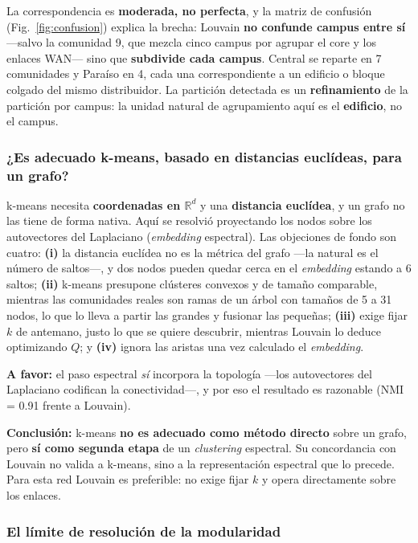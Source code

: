 \documentclass[11pt, a4paper]{article}
\begin{document}
La correspondencia es \textbf{moderada, no perfecta}, y la matriz de
confusión (Fig.~\ref{fig:confusion}) explica la brecha: Louvain \textbf{no
confunde campus entre sí} —salvo la comunidad 9, que mezcla cinco campus
por agrupar el core y los enlaces WAN— sino que \textbf{subdivide cada
campus}. Central se reparte en 7 comunidades y Paraíso en 4, cada una
correspondiente a un edificio o bloque colgado del mismo distribuidor. La
partición detectada es un \textbf{refinamiento} de la partición por campus:
la unidad natural de agrupamiento aquí es el \textbf{edificio}, no el
campus.

\subsubsection*{¿Es adecuado k-means, basado en distancias euclídeas, para un grafo?}

k-means necesita \textbf{coordenadas en $\mathbb{R}^d$} y una
\textbf{distancia euclídea}, y un grafo no las tiene de forma nativa. Aquí
se resolvió proyectando los nodos sobre los autovectores del Laplaciano
(\textit{embedding} espectral). Las objeciones de fondo son cuatro:
\textbf{(i)} la distancia euclídea no es la métrica del grafo —la natural
es el número de saltos—, y dos nodos pueden quedar cerca en el
\textit{embedding} estando a 6 saltos; \textbf{(ii)} k-means presupone
clústeres convexos y de tamaño comparable, mientras las comunidades reales
son ramas de un árbol con tamaños de 5 a 31 nodos, lo que lo lleva a partir
las grandes y fusionar las pequeñas; \textbf{(iii)} exige fijar $k$ de
antemano, justo lo que se quiere descubrir, mientras Louvain lo deduce
optimizando $Q$; y \textbf{(iv)} ignora las aristas una vez calculado el
\textit{embedding}.

\textbf{A favor:} el paso espectral \textit{sí} incorpora la topología —los
autovectores del Laplaciano codifican la conectividad—, y por eso el
resultado es razonable (NMI = 0.91 frente a Louvain).

\textbf{Conclusión:} k-means \textbf{no es adecuado como método directo}
sobre un grafo, pero \textbf{sí como segunda etapa} de un \textit{clustering}
espectral. Su concordancia con Louvain no valida a k-means, sino a la
representación espectral que lo precede. Para esta red Louvain es
preferible: no exige fijar $k$ y opera directamente sobre los enlaces.

\subsubsection*{El límite de resolución de la modularidad}
\end{document}
